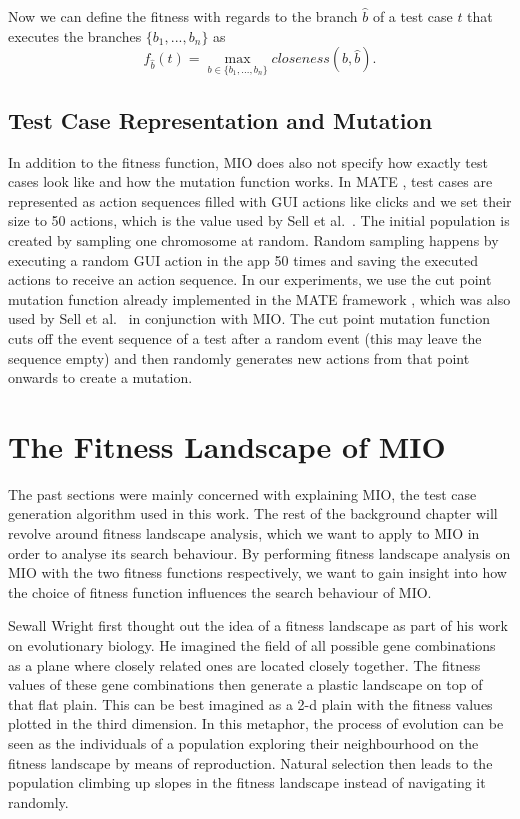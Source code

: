 \documentclass[
  a4paper,  %
  twoside,  %
  bibliography=totoc,
  headsepline,
  cleardoublepage=empty,
  parskip=half,
  draft=false
]{scrbook}
\begin{document}
Now we can define the fitness with regards to the branch $\hat{b}$ of a test case $t$ that executes the branches $\{b_1, ..., b_n\}$ as
\begin{equation}
	f_{\hat{b}}(t) = \max_{b \in \{b_1, ..., b_n\}}{closeness(b, \hat{b})}.
\end{equation}

\subsection{Test Case Representation and Mutation}
In addition to the fitness function, MIO does also not specify how exactly test cases look like and how the mutation function works.
In MATE \cite{MATE}, test cases are represented as action sequences filled with GUI actions like clicks \cite{sell2019empirical} and we set their size to 50 actions, which is the value used by Sell et al.~\cite{sell2019empirical}.
The initial population is created by sampling one chromosome at random. 
Random sampling happens by executing a random GUI action in the app 50 times and saving the executed actions to receive an action sequence.
In our experiments, we use the cut point mutation function already implemented in the MATE framework \cite{MATE}, which was also used by Sell et al.~\cite{sell2019empirical} in conjunction with MIO.
The cut point mutation function cuts off the event sequence of a test after a random event (this may leave the sequence empty) and then randomly generates new actions from that point onwards to create a mutation.


\section{The Fitness Landscape of MIO}

The past sections were mainly concerned with explaining MIO, the test case generation algorithm used in this work. The rest of the background chapter will revolve around fitness landscape analysis, which we want to apply to MIO in order to analyse its search behaviour.
By performing fitness landscape analysis on MIO with the two fitness functions respectively, we want to gain insight into how the choice of fitness function influences the search behaviour of MIO.

Sewall Wright \cite{wright1932roles} first thought out the idea of a fitness landscape as part of his work on evolutionary biology.
He imagined the field of all possible gene combinations as a plane where closely related ones are located closely together. The fitness values of these gene combinations then generate a plastic landscape on top of that flat plain.
This can be best imagined as a 2-d plain with the fitness values plotted in the third dimension.
In this metaphor, the process of evolution can be seen as the individuals of a population exploring their neighbourhood on the fitness landscape by means of reproduction.
Natural selection then leads to the population climbing up slopes in the fitness landscape instead of navigating it randomly.
\end{document}
